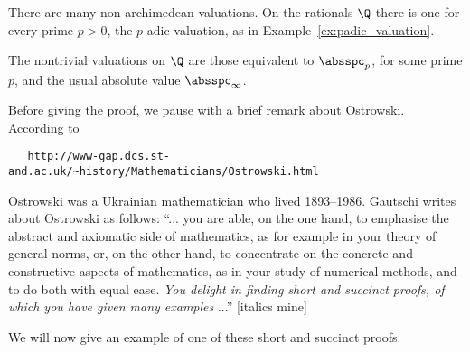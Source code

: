 There are many non-archimedean valuations.  On the rationals $\Q$
there is one for every prime $p>0$, the $p$-adic valuation, as
in Example~\ref{ex:padic_valuation}.

\begin{theorem}[Ostrowski]\label{thm:ostrowski}
The nontrivial valuations
on $\Q$ are those equivalent to $\absspc_p$, for some
prime $p$, and the usual absolute value $\absspc_\infty$.
\end{theorem}
\begin{remark}
Before giving the proof, we pause with a brief remark about
Ostrowski.  According to
\begin{verbatim}
   http://www-gap.dcs.st-and.ac.uk/~history/Mathematicians/Ostrowski.html
\end{verbatim}
\noindent{}Ostrowski was a Ukrainian mathematician who lived
1893--1986.  Gautschi writes about Ostrowski as follows: ``... you are
able, on the one hand, to emphasise the abstract and axiomatic side of
mathematics, as for example in your theory of general norms, or, on
the other hand, to concentrate on the concrete and constructive
aspects of mathematics, as in your study of numerical methods, and to
do both with equal ease. {\em You delight in finding short and
succinct proofs, of which you have given many examples} ...'' [italics mine]
\end{remark}
We will now give an example of one of these short and succinct proofs.

